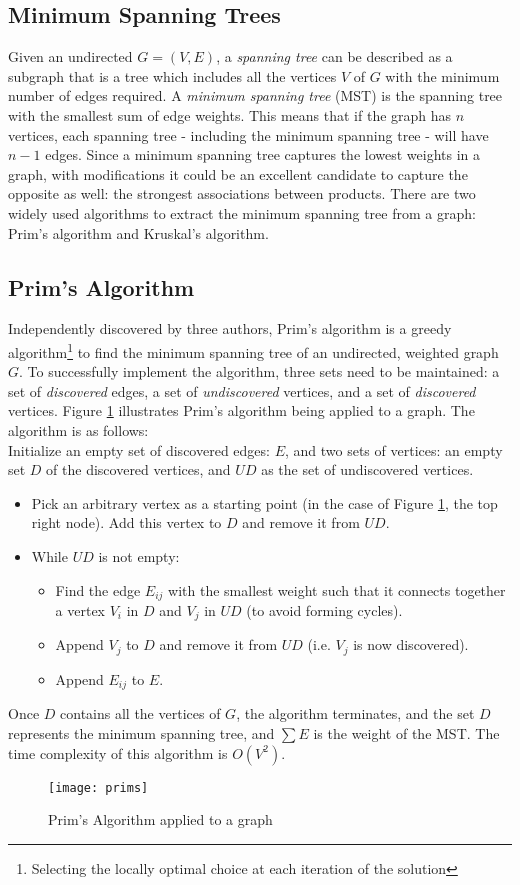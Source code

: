 \subsection{Minimum Spanning Trees}
Given an undirected $G = (V,E)$,  a \textit{spanning tree} can be described as a subgraph that is a tree which includes all the vertices $V$ of $G$ with the minimum number of edges required. A \textit{minimum spanning tree} (MST) is the spanning tree with the smallest sum of edge weights.  This means that if the graph has $n$ vertices, each spanning tree - including the minimum spanning tree - will have $n-1$ edges. Since a minimum spanning tree captures the lowest weights in a graph, with modifications it could be an excellent candidate to capture the opposite as well: the strongest associations between products.
There are two widely used algorithms to extract the minimum spanning tree from a graph: Prim's algorithm and Kruskal's algorithm.

\subsection{Prim's Algorithm}
Independently discovered by three authors,  Prim's algorithm  is a greedy algorithm\footnote{Selecting the locally optimal choice at each iteration of the solution} to find the minimum spanning tree of an undirected,  weighted graph $G$. To successfully implement the algorithm, three sets need to be maintained: a set of \textit{discovered} edges, a set of \textit{undiscovered} vertices, and a set of \textit{discovered} vertices.  Figure \ref{fig:prim} illustrates Prim's algorithm being applied to a graph. The algorithm is as follows:\\
Initialize an empty set of discovered edges: $E$, and two sets of vertices: an empty set $D$ of the discovered vertices, and $UD$ as the set of undiscovered vertices.
\begin{itemize}
\item Pick an arbitrary vertex as a starting point (in the case of Figure \ref{fig:prim}, the top right node). Add this vertex to $D$ and remove it from $UD$.

\item While $UD$ is not empty:
	\begin{itemize}
	\item Find the edge $E_{ij}$ with the smallest weight such that it connects together a vertex $V_i$ in $D$ and $V_j$ in $UD$ (to avoid forming cycles).
	\item Append $V_j$ to $D$ and remove it from $UD$ (i.e. $V_j$ is now discovered).
	\item Append $E_{ij}$ to $E$.
	\end{itemize}
\end{itemize}
Once $D$ contains all the vertices of $G$, the algorithm terminates, and the set $D$ represents the minimum spanning tree, and $\sum{E}$ is the weight of the MST. The time complexity of this algorithm is $O(V^2)$.
\begin{figure}[H]
\centering\texttt{[image: prims]}
\caption{Prim's Algorithm applied to a graph  }\label{fig:prim}
\end{figure}

